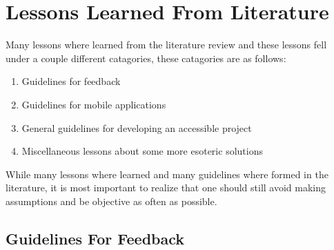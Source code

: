 \documentclass{article}
\begin{document}
\section{Lessons Learned From Literature}

Many lessons where learned from the literature review and these lessons fell under a couple different catagories, these catagories are as follows:
\begin{enumerate}
    \item Guidelines for feedback
    \item Guidelines for mobile applications
    \item General guidelines for developing an accessible project
    \item Miscellaneous lessons about some more esoteric solutions
\end{enumerate}
While many lessons where learned and many guidelines where formed in the literature, it is most important to realize that one should still avoid making assumptions and be objective as often as possible.

\subsection{Guidelines For Feedback}
\end{document}
